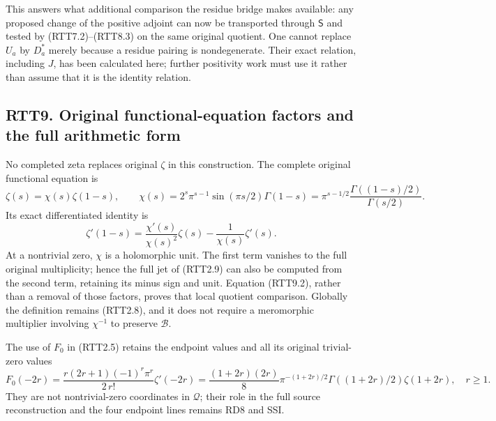 This answers what additional comparison the residue bridge makes
available: any proposed change of the positive adjoint can now be
transported through \(\mathsf S\) and tested by (RTT7.2)--(RTT8.3) on
the same original quotient. One cannot replace \(U_a\) by \(D_a^*\)
merely because a residue pairing is nondegenerate. Their exact relation,
including \(J\), has been calculated here; further positivity work must
use it rather than assume that it is the identity relation.

\subsection{RTT9. Original functional-equation factors and the full
arithmetic
form}\label{rtt9.-original-functional-equation-factors-and-the-full-arithmetic-form}

No completed zeta replaces original \(\zeta\) in this construction. The
complete original functional equation is \[
\zeta(s)=\chi(s)\zeta(1-s),\qquad
\chi(s)=2^s\pi^{s-1}\sin(\pi s/2)\Gamma(1-s)
=\pi^{s-1/2}\frac{\Gamma((1-s)/2)}{\Gamma(s/2)}.
\tag{RTT9.1}
\] Its exact differentiated identity is \[
\zeta'(1-s)=\frac{\chi'(s)}{\chi(s)^2}\zeta(s)
-\frac1{\chi(s)}\zeta'(s).
\tag{RTT9.2}
\] At a nontrivial zero, \(\chi\) is a holomorphic unit. The first term
vanishes to the full original multiplicity; hence the full jet of
(RTT2.9) can also be computed from the second term, retaining its minus
sign and unit. Equation (RTT9.2), rather than a removal of those
factors, proves that local quotient comparison. Globally the definition
remains (RTT2.8), and it does not require a meromorphic multiplier
involving \(\chi^{-1}\) to preserve \(\mathcal B\).

The use of \(F_0\) in (RTT2.5) retains the endpoint values and all its
original trivial-zero values \[
F_0(-2r)=\frac{r(2r+1)(-1)^r\pi^r}{2\,r!}\zeta'(-2r)
=\frac{(1+2r)(2r)}8\pi^{-(1+2r)/2}
\Gamma((1+2r)/2)\zeta(1+2r),\quad r\ge1.
\tag{RTT9.3}
\] They are not nontrivial-zero coordinates in \(\mathcal Q\); their
role in the full source reconstruction and the four endpoint lines
remains RD8 and SSI.

